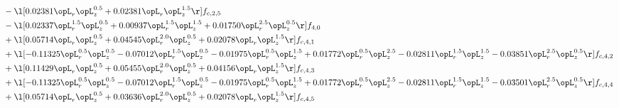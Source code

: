 \begin{alignat}{2}
& - \l[  0.02381 \opL_r \opL_z^{0.5} +  0.02381 \opL_r \opL_z^{1.5}  \r] f_{c,2,5} \nonumber \\ 
& - \l[  0.02337 \opL_r^{1.5} \opL_z^{0.5} +  0.00937 \opL_r^{1.5} \opL_z^{1.5} +  0.01750 \opL_r^{2.5} \opL_z^{0.5}  \r] f_{4,0} \nonumber \\ 
& + \l[  0.05714 \opL_r \opL_z^{0.5} +  0.04545 \opL_r^{2.0} \opL_z^{0.5} +  0.02078 \opL_r \opL_z^{1.5}  \r] f_{c,4,1} \nonumber \\ 
& + \l[  -0.11325 \opL_r^{0.5} \opL_z^{0.5}   -0.07012 \opL_r^{1.5} \opL_z^{0.5}   -0.01975 \opL_r^{0.5} \opL_z^{1.5} +  0.01772 \opL_r^{0.5} \opL_z^{2.5}   -0.02811 \opL_r^{1.5} \opL_z^{1.5}   -0.03851 \opL_r^{2.5} \opL_z^{0.5}  \r] f_{c,4,2} \nonumber \\ 
& + \l[  0.11429 \opL_r \opL_z^{0.5} +  0.05455 \opL_r^{2.0} \opL_z^{0.5} +  0.04156 \opL_r \opL_z^{1.5}  \r] f_{c,4,3} \nonumber \\ 
& + \l[  -0.11325 \opL_r^{0.5} \opL_z^{0.5}   -0.07012 \opL_r^{1.5} \opL_z^{0.5}   -0.01975 \opL_r^{0.5} \opL_z^{1.5} +  0.01772 \opL_r^{0.5} \opL_z^{2.5}   -0.02811 \opL_r^{1.5} \opL_z^{1.5}   -0.03501 \opL_r^{2.5} \opL_z^{0.5}  \r] f_{c,4,4} \nonumber \\ 
& + \l[  0.05714 \opL_r \opL_z^{0.5} +  0.03636 \opL_r^{2.0} \opL_z^{0.5} +  0.02078 \opL_r \opL_z^{1.5}  \r] f_{c,4,5} \nonumber \\ 
\end{alignat} 


